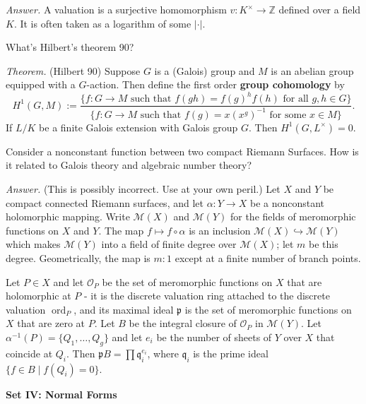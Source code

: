 \documentclass{mathproblems}
\newcommand\Z{\mathbb{Z}}
\begin{document}
\begin{questions}
\textit{Answer.} A valuation is a surjective homomorphism $v:K^\times\to \Z$ defined over a field $K$. It is often taken as a logarithm of some $|\cdot|$.



\miquestion
{\color{blue} What's Hilbert's theorem 90?}

{\color{violet}
\textit{Theorem.} (Hilbert 90) Suppose $G$ is a (Galois) group and $M$ is an abelian group equipped with a $G$-action. Then define the first order \textbf{group cohomology} by
$$
H^1(G,M):=\frac{\{f:G\to M \text{ such that } f(gh)=f(g)^hf(h)\text{ for all }g,h\in G\}}{\{f:G\to M \text{ such that } f(g)=x(x^g)^{-1}\text{ for some } x\in M\}}.
$$
If $L/K$ be a finite Galois extension with Galois group $G$. Then $H^1(G,L^\times)=0$.
}

\miquestion
{\color{blue} Consider a nonconstant function between two compact Riemann Surfaces. How is it related to Galois theory and algebraic number theory?}

\textit{Answer.} {\color{teal}(This is possibly incorrect. Use at your own peril.)} Let $X$ and $Y$ be compact connected Riemann surfaces, and let $\alpha: Y \rightarrow X$ be a nonconstant holomorphic mapping. Write $\mathcal{M}(X)$ and $\mathcal{M}(Y)$ for the fields of meromorphic functions on $X$ and $Y$. The map $f \mapsto f \circ \alpha$ is an inclusion $\mathcal{M}(X) \hookrightarrow \mathcal{M}(Y)$ which makes $\mathcal{M}(Y)$ into a field of finite degree over $\mathcal{M}(X)$; let $m$ be this degree. Geometrically, the map is $m: 1$ except at a finite number of branch points.

Let $P \in X$ and let $\mathcal{O}_P$ be the set of meromorphic functions on $X$ that are holomorphic at $P$ - it is the discrete valuation ring attached to the discrete valuation $\operatorname{ord}_P$, and its maximal ideal $\mathfrak{p}$ is the set of meromorphic functions on $X$ that are zero at $P$. Let $B$ be the integral closure of $\mathcal{O}_P$ in $\mathcal{M}(Y)$. Let $\alpha^{-1}(P)=\{Q_1, \ldots, Q_g\}$ and let $e_i$ be the number of sheets of $Y$ over $X$ that coincide at $Q_i$. Then $\mathfrak{p} B=\prod \mathfrak{q}_i^{e_i}$, where $\mathfrak{q}_i$ is the prime ideal $\{f \in B \mid f(Q_i)=0\}$. 
\end{questions}

\newpage

\centerline {\textbf{Set IV: Normal Forms}}
\end{document}
